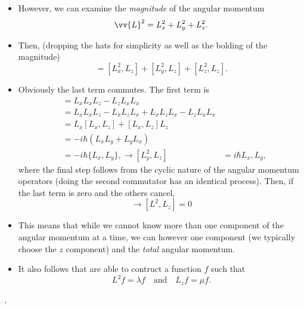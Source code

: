 \begin{itemize}
    \item However, we can examine the \textit{magnitude} of the angular momentum
        \begin{equation}
            \vv{L}^2 = L_x^2 + L_y^2 + L_z^2.
        \end{equation}
    \item Then, (dropping the hats for simplicity as well as the bolding of the magnitude)
        \begin{equation}
            [\vv{L}^2,L_z] = [L_x^2,L_z] + [L_y^2,L_z] + [L_z^2,L_z].
        \end{equation}
    \item Obviously the last term commutes. The first term is
        \begin{align}
            [L_x^2,L_z] &= L_xL_xL_z - L_zL_xL_x \\
            &= L_xL_xL_z - L_xL_zL_x + L_xL_zL_x - L_zL_xL_x \\
            &= L_x[L_x,L_z] + [L_x,L_z]L_z \\
            &= -i\hbar(L_xL_y + L_yL_x) \\
            &= -i\hbar \{L_x,L_y\},
            \rightarrow [L_y^2,L_z] &= i\hbar{L_x,L_y},
        \end{align}
        where the final step follows from the cyclic nature of the angular momentum operators (doing the second commutator has an identical process). Then, if the last term is zero and the others cancel,
        \begin{equation}
            \rightarrow [L^2, L_z] = 0
        \end{equation}
    \item This means that while we cannot know more than one component of the angular momentum at a time, we can however one component (we typically choose the $z$ component) and the \textit{total} angular momentum.
    \item It also follows that are able to contruct a function $f$ such that
        \begin{equation}
            L^2 f = \lambda f \quad\mathrm{and}\quad L_zf = \mu f.
        \end{equation}
\end{itemize}


\sep



